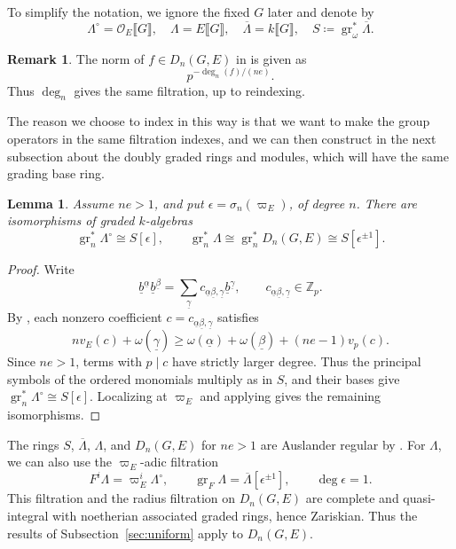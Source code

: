 \documentclass[11pt]{article}
\newtheorem{lemma}[theorem]{Lemma}
\theoremstyle{definition}
\newtheorem{remark}[theorem]{Remark}
\newcommand{\cO}{\mathcal O}
\newcommand{\gr}{\operatorname{gr}}
\begin{document}
To simplify the notation, we ignore the fixed $G$ later and denote by \[\Lambda ^\circ=\cO_E\llbracket G\rrbracket,\quad \Lambda =E\llbracket G\rrbracket,\quad \overline{\Lambda} =k\llbracket G\rrbracket,\quad S \coloneqq\gr_\omega^*\overline{\Lambda} .\]

\begin{remark}
The norm of $f\in D_n(G,E)$ in \cite{ST03} is given as
\[
 p^{-\deg_n(f)/(ne)}.
\]
Thus $\deg_n$ gives the same filtration, up to reindexing.

      The reason we choose to index in this way is that we want to make the group operators in the same filtration indexes, and we can then construct in the next subsection about the doubly graded rings and modules, which will have the same grading base ring.
\end{remark}


\begin{lemma}\label{lem:graded-distribution-ring}
Assume $ne>1$, and put $\epsilon=\sigma_n(\varpi_E)$, of degree $n$.
There are isomorphisms of graded $k$-algebras
\[
 \gr_n^{*}\Lambda^\circ\cong S[\epsilon],\qquad
 \gr_n^{*}\Lambda\cong\gr_n^{*}D_n(G,E)
       \cong S[\epsilon^{\pm1}].
\]
\end{lemma}

\begin{proof}
Write
\[
 \underline b^{\underline\alpha}\underline b^{\underline\beta}
 =\sum_{\underline\gamma}c_{\underline\alpha\underline\beta,\underline\gamma}
                   \underline b^{\underline\gamma},
 \qquad c_{\underline\alpha\underline\beta,\underline\gamma}\in\mathbb Z_p.
\]
By \cite[Lemma~4.1]{ST03}, each nonzero coefficient $c=c_{\underline\alpha\underline\beta,\underline\gamma}$ satisfies
\[
 nv_E(c)+\omega(\underline\gamma)
 \geq\omega(\underline\alpha)+\omega(\underline\beta)
       +(ne-1)v_p(c).
\]
Since $ne>1$, terms with $p\mid c$ have strictly larger degree.
Thus the principal symbols of the ordered monomials multiply as in
$S$, and their bases give $\gr_n^{*}\Lambda^\circ\cong S[\epsilon]$.
Localizing at $\varpi_E$ and applying \cite[Lemma~4.3]{ST03}
gives the remaining isomorphisms.
\end{proof}

The rings $S$, $\overline\Lambda$,
$\Lambda$, and $D_n(G,E)$ for $ne>1$ are Auslander regular by
\cite[Chapter~III, Theorem~2.2.5]{LvO96}.
For $\Lambda$, we can also use the $\varpi_E$-adic filtration
\[
 F^i\Lambda=\varpi_E^i\Lambda^\circ,\qquad
 \gr_F\Lambda=\overline\Lambda[\epsilon^{\pm1}],\qquad
 \deg\epsilon=1.
\]
This filtration and the radius filtration on $D_n(G,E)$ are
complete and quasi-integral with noetherian associated graded
rings, hence Zariskian. Thus the results of
Subsection~\ref{sec:uniform} apply to $D_n(G,E)$.
\end{document}
